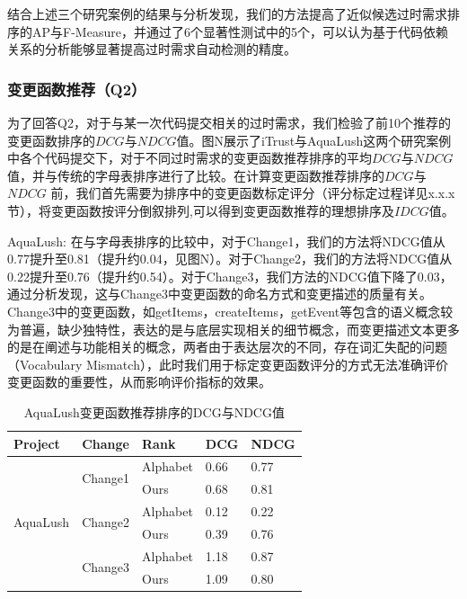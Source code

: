 结合上述三个研究案例的结果与分析发现，我们的方法提高了近似候选过时需求排序的AP与F-Measure，并通过了6个显著性测试中的5个，可以认为基于代码依赖关系的分析能够显著提高过时需求自动检测的精度。

\subsubsection{变更函数推荐（Q2）}

为了回答Q2，对于与某一次代码提交相关的过时需求，我们检验了前10个推荐的变更函数排序的$DCG$与$NDCG$值。图N展示了iTrust与AquaLush这两个研究案例中各个代码提交下，对于不同过时需求的变更函数推荐排序的平均$DCG$与$NDCG$值，并与传统的字母表排序进行了比较。在计算变更函数推荐排序的$DCG$与$NDCG$
前，我们首先需要为排序中的变更函数标定评分（评分标定过程详见x.x.x节），将变更函数按评分倒叙排列,可以得到变更函数推荐的理想排序及$IDCG$值。

AquaLush: 在与字母表排序的比较中，对于Change1，我们的方法将NDCG值从0.77提升至0.81（提升约0.04，见图N）。对于Change2，我们的方法将NDCG值从0.22提升至0.76（提升约0.54）。对于Change3，我们方法的NDCG值下降了0.03，通过分析发现，这与Change3中变更函数的命名方式和变更描述的质量有关。Change3中的变更函数，如getItems，createItems，getEvent等包含的语义概念较为普遍，缺少独特性，表达的是与底层实现相关的细节概念，而变更描述文本更多的是在阐述与功能相关的概念，两者由于表达层次的不同，存在词汇失配的问题（Vocabulary Mismatch），此时我们用于标定变更函数评分的方式无法准确评价变更函数的重要性，从而影响评价指标的效果。

\begin{table}[]
\centering
\caption{AquaLush变更函数推荐排序的DCG与NDCG值}
\label{my-label}
\begin{tabular}{lllll}
\hline
Project                   & Change                   & Rank     & DCG  & NDCG \\ \hline
\multirow{6}{*}{AquaLush} & \multirow{2}{*}{Change1} & Alphabet & 0.66 & 0.77 \\
                          &                          & Ours     & 0.68 & 0.81 \\
                          & \multirow{2}{*}{Change2} & Alphabet & 0.12 & 0.22 \\
                          &                          & Ours     & 0.39 & 0.76 \\
                          & \multirow{2}{*}{Change3} & Alphabet & 1.18 & 0.87 \\
                          &                          & Ours     & 1.09 & 0.80 \\ \hline
\end{tabular}
\end{table}


